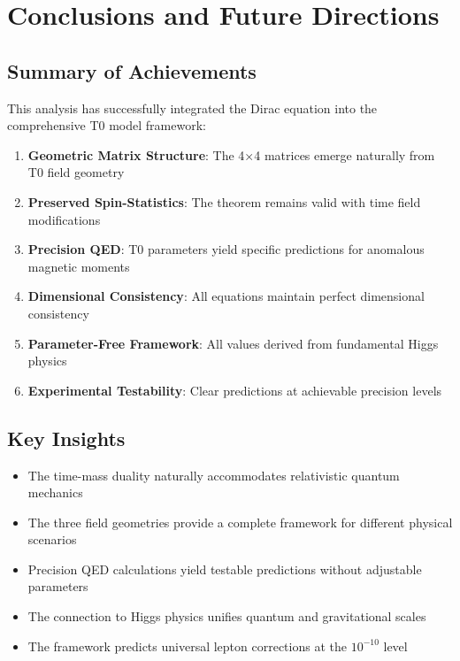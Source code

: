 \documentclass[12pt,a4paper]{article}
\begin{document}
	\section{Conclusions and Future Directions}
	\label{sec:conclusions}
	
	\subsection{Summary of Achievements}
	\label{subsec:summary_achievements}
	
	This analysis has successfully integrated the Dirac equation into the comprehensive T0 model framework:
	
	\begin{enumerate}
		\item \textbf{Geometric Matrix Structure}: The 4×4 matrices emerge naturally from T0 field geometry
		\item \textbf{Preserved Spin-Statistics}: The theorem remains valid with time field modifications
		\item \textbf{Precision QED}: T0 parameters yield specific predictions for anomalous magnetic moments
		\item \textbf{Dimensional Consistency}: All equations maintain perfect dimensional consistency
		\item \textbf{Parameter-Free Framework}: All values derived from fundamental Higgs physics
		\item \textbf{Experimental Testability}: Clear predictions at achievable precision levels
	\end{enumerate}
	
	\subsection{Key Insights}
	\label{subsec:key_insights}
	
	\begin{tcolorbox}[colback=green!5!white,colframe=green!75!black,title=T0 Dirac Integration: Key Results]
		\begin{itemize}
			\item The time-mass duality naturally accommodates relativistic quantum mechanics
			\item The three field geometries provide a complete framework for different physical scenarios
			\item Precision QED calculations yield testable predictions without adjustable parameters
			\item The connection to Higgs physics unifies quantum and gravitational scales
			\item The framework predicts universal lepton corrections at the $10^{-10}$ level
		\end{itemize}
	\end{tcolorbox}
	
\end{document}
